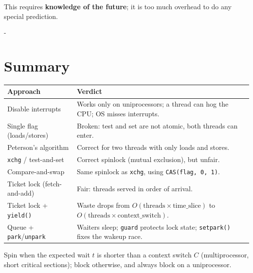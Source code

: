 \documentclass[11pt,a4paper]{article}
\makeatletter
\newcommand{\keepspace}[1]{\par\penalty-100\begingroup
  \setlength{\dimen@}{#1}\dimen@ii\pagegoal\advance\dimen@ii-\pagetotal
  \ifdim\dimen@>\dimen@ii\ifdim\dimen@ii>\z@\vfil\fi\break\fi\endgroup}
\makeatother
\begin{document}
\begin{warnbox}[Problem]
This requires \textbf{knowledge of the future}; it is too much overhead to
do any special prediction.
\end{warnbox}

\keepspace{16\baselineskip}
\section{Summary}

\begin{center}
\renewcommand{\arraystretch}{1.2}
\small
\begin{tabularx}{\textwidth}{@{}lX@{}}
  \toprule
  \textbf{Approach} & \textbf{Verdict} \\
  \midrule
  Disable interrupts & Works only on uniprocessors; a thread can hog the CPU;
                       OS misses interrupts. \\
  Single flag (loads/stores) & Broken: test and set are not atomic, both
                       threads can enter. \\
  Peterson's algorithm & Correct for two threads with only loads and stores. \\
  \texttt{xchg} / test-and-set & Correct spinlock (mutual exclusion), but
                       unfair. \\
  Compare-and-swap & Same spinlock as \texttt{xchg}, using \texttt{CAS(flag, 0, 1)}. \\
  Ticket lock (fetch-and-add) & Fair: threads served in order of arrival. \\
  Ticket lock + \texttt{yield()} & Waste drops from
                       \(O(\text{threads}\times\text{time\_slice})\) to
                       \(O(\text{threads}\times\text{context\_switch})\). \\
  Queue + \texttt{park}/\texttt{unpark} & Waiters sleep; \texttt{guard}
                       protects lock state; \texttt{setpark()} fixes the
                       wakeup race. \\
  \bottomrule
\end{tabularx}
\end{center}

\begin{keybox}
Spin when the expected wait \(t\) is shorter than a context switch \(C\)
(multiprocessor, short critical sections); block otherwise, and always
block on a uniprocessor.
\end{keybox}
\end{document}
